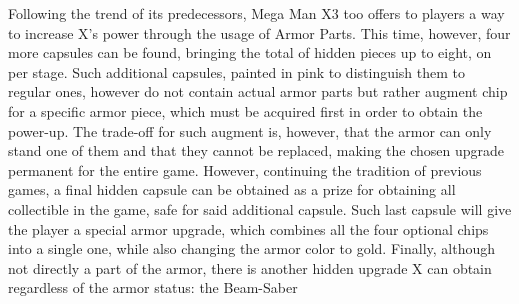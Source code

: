 Following the trend of its predecessors, Mega Man X3 too offers to players a way to increase X's power through the usage of Armor Parts. This time, however, four more capsules can be found, bringing the total of hidden pieces up to eight, on per stage. Such additional capsules, painted in pink to distinguish them to regular ones, however do not contain actual armor parts but rather augment chip for a specific armor piece, which must be acquired first in order to obtain the power-up. The trade-off for such augment is, however, that the armor can only stand one of them and that they cannot be replaced, making the chosen upgrade permanent for the entire game. However, continuing the tradition of previous games, a final hidden capsule can be obtained as a prize for obtaining all collectible in the game, safe for said additional capsule. Such last capsule will give the player a special armor upgrade, which combines all the four optional chips into a single one, while also changing the armor color to gold. Finally, although not directly a part of the armor, there is another hidden upgrade X can obtain regardless of the armor status: the Beam-Saber

